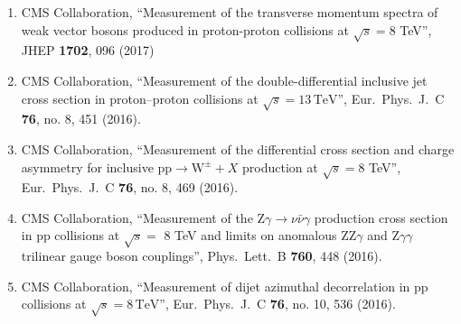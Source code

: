 \begin{itemize}
\begin{enumerate}
\item CMS Collaboration, ``Measurement of the transverse momentum spectra of weak vector bosons produced in proton-proton collisions at $ \sqrt{s}=8 $ TeV'', JHEP {\bf 1702}, 096 (2017)

\item CMS Collaboration, ``Measurement of the double-differential inclusive jet cross section in proton–proton collisions at $\sqrt{s} = 13\,\text {TeV} $'', Eur.\ Phys.\ J.\ C {\bf 76}, no. 8, 451 (2016).

\item CMS Collaboration, ``Measurement of the differential cross section and charge asymmetry for inclusive $\mathrm {p}\mathrm {p}\rightarrow \mathrm {W}^{\pm }+X$ production at ${\sqrt{s}} = 8$ TeV'', Eur.\ Phys.\ J.\ C {\bf 76}, no. 8, 469 (2016).

\item CMS Collaboration, ``Measurement of the $ \mathrm{ Z } \gamma \rightarrow \nu \bar{\nu} \gamma$ production cross section in pp collisions at $\sqrt{s}=$ 8 TeV and limits on anomalous $ \mathrm{ ZZ } \gamma$ and $ \mathrm{Z} \gamma \gamma$ trilinear gauge boson couplings'', Phys.\ Lett.\ B {\bf 760}, 448 (2016).

\item CMS Collaboration, ``Measurement of dijet azimuthal decorrelation in pp collisions at $\sqrt{s}=8\,\mathrm{TeV} $'', Eur.\ Phys.\ J.\ C {\bf 76}, no. 10, 536 (2016).


\end{enumerate}
\end{itemize}
